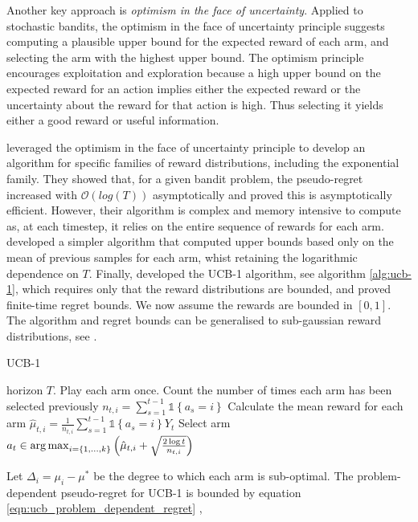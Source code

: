 \documentclass[11pt,a4paper,twoside]{report}
\newcommand{\set}[1]{\left\{#1\right\}}
\newcommand{\ind}[1]{\mathds{1}\!\!\set{#1}}
\newcommand{\argmax}{\operatornamewithlimits{arg\,max}}
\newcommand{\bigo}[1]{\mathcal{O}\left( #1 \right)}
\theoremstyle{plain}
\theoremstyle{definition}
\begin{document}
Another key approach is \emph{optimism in the face of uncertainty}. Applied to stochastic bandits, the optimism in the face of uncertainty principle suggests computing a plausible upper bound for the expected reward of each arm, and selecting the arm with the highest upper bound. The optimism principle encourages exploitation and exploration because a high upper bound on the expected reward for an action implies either the expected reward or the uncertainty about the reward for that action is high. Thus selecting it yields either a good reward or useful information. 

\citet{Lai1985} leveraged the optimism in the face of uncertainty principle to develop an algorithm for specific families of reward distributions, including the exponential family. They showed that, for a given bandit problem, the pseudo-regret increased with $\bigo{log(T)}$ asymptotically and proved this is asymptotically efficient. However, their algorithm is complex and memory intensive to compute as, at each timestep, it relies on the entire sequence of rewards for each arm. \citet{Agrawal1995} developed a simpler algorithm that computed upper bounds based only on the mean of previous samples for each arm, whist retaining the logarithmic dependence on $T$. Finally, \citet{Auer2002} developed the UCB-1 algorithm, see algorithm \ref{alg:ucb-1}, which requires only that the reward distributions are bounded, and proved finite-time regret bounds. We now assume the rewards are bounded in $[0,1]$. The algorithm and regret bounds can be generalised to sub-gaussian reward distributions, see \citet{Bubeck2012}.

\begin{algorithm}[H]
\caption{UCB-1}\label{alg:ucb-1}
\begin{algorithmic}[1]
 horizon $T$.
\STATE Play each arm once. 
\STATE Count the number of times each arm has been selected previously $n_{t,i} = \sum_{s=1}^{t-1} \ind{a_s = i}$
\STATE Calculate the mean reward for each arm $\hat{\mu}_{t,i} = \frac{1}{n_{t,i}} \sum_{s=1}^{t-1}\ind{a_s = i}Y_t$
\STATE Select arm $a_t \in \argmax_{i = \set{1,...,k}}\left(\hat{\mu}_{t,i}+\sqrt{\frac{2 \log{t}}{n_{t,i}}}\right)$
\ENDFOR
\end{algorithmic}
\end{algorithm}
 
Let $\Delta_i = \mu_i - \mu^*$ be the degree to which each arm is sub-optimal. The problem-dependent pseudo-regret for UCB-1 is bounded by equation \ref{eqn:ucb_problem_dependent_regret} \citep{Bubeck2012},
\end{document}
